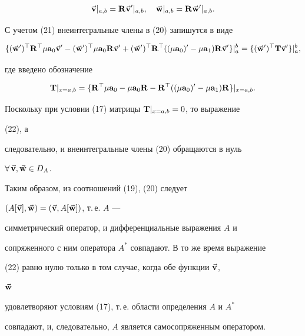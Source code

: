 \begin{pf}
\begin{equation} 


\vb{v}|_{a,b}=\bold R\vb{v}'|_{a,b},\quad 


\vb{w}|_{a,b}=\bold R\vb{w}'|_{a,b}. 


\end{equation} 


С учетом (21) внеинтегральные члены в (20) запишутся в виде 


\begin{equation} 


\{(\vb{w}')^\top\bold R^\top\mu\bold a_0\vb{v}'- 


(\vb{w}')^\top\mu\bold a_0\bold R\vb{v}'+ 


(\vb{w}')^\top\bold R^\top((\mu\bold a_0)'-\mu\bold a_1) 


\bold R\vb{v}'\}|^b_a= 


\{(\vb{w}')^\top\bold T\vb{v}'\}|^b_a, 


\end{equation} 


где введено обозначение


$$ 


\bold T|_{x=a,b}=\{\bold R^\top\mu\bold a_0- 


\mu\bold a_0\bold R-\bold R^\top((\mu\bold a_0)'- 


\mu\bold a_1)\bold R\}|_{x=a,b}. 


$$ 


Поскольку при условии (17) матрицы $\bold T|_{x=a,b}=0$, то выражение 


(22), а 


следовательно, и внеинтегральные члены (20) обращаются в нуль 


$\forall\,\Vec{\bold{v}},\Vec{\bold{w}}\in D_A$. 


Таким образом, из соотношений (19), (20) следует 


$(A[\Vec{\bold{v}}],\Vec{\bold{w}})=(\Vec{\bold{v}},A[\Vec{\bold{w}}])$, т.\,е. $A$ --- 


симметрический оператор, и дифференциальные выражения $A$ и 


сопряженного с ним оператора $A^*$ совпадают. В то же время выражение 


(22) равно нулю только в том случае, когда обе функции $\Vec{\bold{v}}$, 


$\Vec{\bold{w}}$ 


удовлетворяют условиям (17), т.\,е. области определения $A$ и $A^*$ 


совпадают, и, следовательно, $A$ является самосопряженным оператором. 


\end{pf} 


